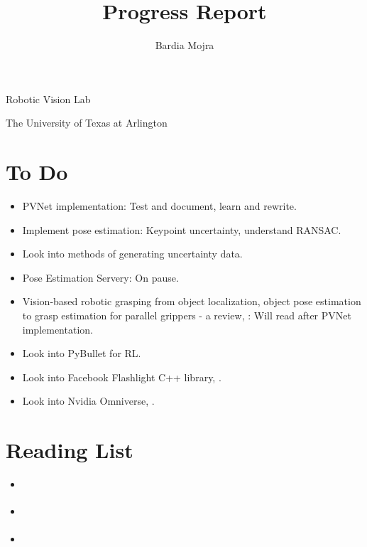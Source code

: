 \documentclass[11pt]{article}
\title{Progress Report}
\author{Bardia Mojra}
\begin{document}
\maketitle
\thispagestyle{empty}

\bigskip
\bigskip
\begin{center}
      Robotic Vision Lab
\end{center}

\begin{center}
      The University of Texas at Arlington
\end{center}

\newpage

\section{To Do}
\begin{itemize}
      \item PVNet implementation: Test and document, learn and rewrite.
      \item Implement pose estimation: Keypoint uncertainty, understand RANSAC.
      \item Look into methods of generating uncertainty data.
      \item Pose Estimation Servery: On pause.
      \item Vision-based robotic grasping from object localization, object pose
      estimation to grasp estimation for parallel grippers - a review,
      \cite{du2020vision}: Will read after PVNet implementation.
      \item Look into PyBullet for RL.
      \item Look into Facebook Flashlight C++ library, \cite{flashlig35:online}.
      \item Look into Nvidia Omniverse, \cite{NVIDIAOm1:online}.
\end{itemize}

\section{Reading List}
\begin{itemize}
      \item \cite{ferraz2014leveraging}
      \item \cite{he2015deep}
      \item \cite{du2020vision}
\end{itemize}
\end{document}
